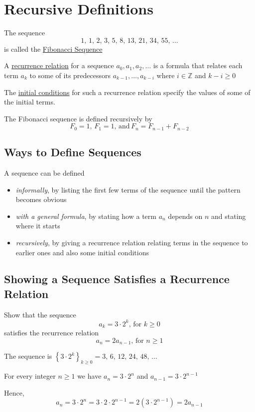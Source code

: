 \section{Recursive Definitions}
\begin{example}
    The sequence $$1,\,1,\,2,\,3,\,5,\,8,\,13,\,21,\,34,\,55,\,\dots$$ is called the \underline{Fibonacci Sequence}
\end{example}

\begin{definition}
    A \underline{recurrence relation} for a sequence $a_0,a_1,a_2,\dots$ is a formula that relates each term $a_k$ to some of its predecessors $a_{k-1},\dots,a_{k-i}$ where $i\in\mathbb Z$ and $k-i \geq 0$

    The \underline{initial conditions} for such a recurrence relation specify the values of some of the initial terms.
\end{definition}

\begin{example}
The Fibonacci sequence is defined recursively by $$F_0 = 1,\, F_1 = 1,\,\text{and}\,F_n = F_{n-1} + F_{n-2}$$
\end{example}

\subsection{Ways to Define Sequences}
A sequence can be defined
\begin{itemize}
    \item \emph{informally}, by listing the first few terms of the sequence until the pattern becomes obvious
    \item \emph{with a general formula}, by stating how a term $a_n$ depends on $n$ and stating where it starts
    \item \emph{recursively}, by giving a recurrence relation relating terms in the sequence to earlier ones and also some initial conditions
\end{itemize}

\subsection{Showing a Sequence Satisfies a Recurrence Relation}
\begin{example}
Show that the sequence $$a_k = 3\cdot 2^k,\,\text{for }k\geq 0$$ satisfies the recurrence relation $$a_n = 2a_{n-1},\,\text{for }n\geq 1$$

The sequence is $\displaystyle \left\{3\cdot 2^k\right\}_{k\geq 0} = 3,\,6,\,12,\,24,\,48,\,\dots$

For every integer $n\geq 1$ we have $a_n = 3\cdot 2^n$ and $a_{n-1} = 3\cdot 2^{n-1}$

Hence, $$a_n = 3\cdot 2^n = 3\cdot 2\cdot 2^{n-1} = 2 (3\cdot 2^{n-1}) = 2 a_{n-1}$$
\end{example}

